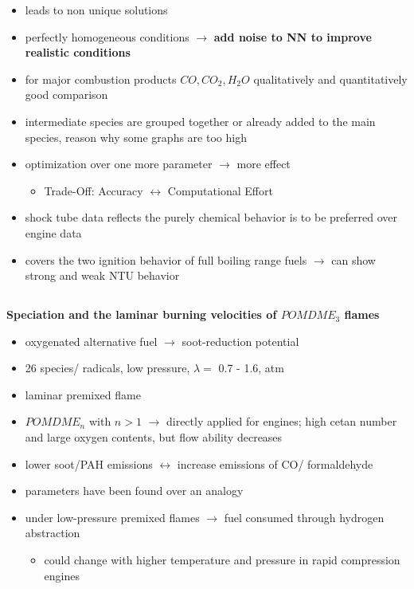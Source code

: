 \documentclass[12pt,oneside,a4paper,english]{article}
\begin{document}
\begin{itemize}
\item{leads to non unique solutions}
\item{perfectly homogeneous conditions $\rightarrow$ \textbf{add noise to NN to improve realistic conditions}}
\item{for major combustion products $CO, CO_2, H_2O$ qualitatively and quantitatively good comparison}
\item{intermediate species are grouped together or already added to the main species, reason why some graphs are too high}
\item{optimization over one more parameter $\rightarrow$ more effect}

	\begin{itemize}
	\item{Trade-Off: Accuracy $\leftrightarrow$ Computational Effort}
	\end{itemize}
	
\item{shock tube data reflects the purely chemical behavior is to be preferred over engine data}
\item{covers the two ignition behavior of full boiling range fuels $\rightarrow$ can show strong and weak NTU behavior} \\
\end{itemize} 


\subsection{\cite{sun2017}} %
\textbf{Speciation and the laminar burning velocities of $POMDME_3$ flames}

\begin{itemize}
\item{oxygenated alternative fuel $\rightarrow$ soot-reduction potential}
\item{26 species/ radicals, low pressure, $\lambda=$ 0.7 - 1.6, atm}
\item{laminar premixed flame}
\item{$POMDME_n$ with $n>1$ $\rightarrow$ directly applied for engines; high cetan number and large oxygen contents, but flow ability decreases}
\item{lower soot/PAH emissions $\leftrightarrow$ increase emissions of CO/ formaldehyde}
\item{parameters have been found over an analogy}
\item{under low-pressure premixed flames $\rightarrow$ fuel consumed through hydrogen abstraction}

	\begin{itemize}
	\item{could change with higher temperature and pressure in rapid compression engines} \\
	\end{itemize}

\end{itemize}
\end{document}
